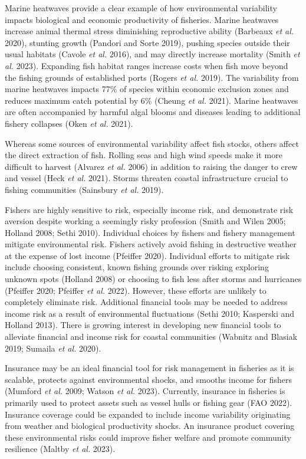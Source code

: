 \documentclass[
  letterpaper,
  DIV=11,
  numbers=noendperiod]{scrartcl}
\theoremstyle{plain}
\theoremstyle{plain}
\theoremstyle{remark}
\begin{document}
Marine heatwaves provide a clear example of how environmental
variability impacts biological and economic productivity of fisheries.
Marine heatwaves increase animal thermal stress diminishing reproductive
ability (Barbeaux \emph{et al.} 2020), stunting growth (Pandori and
Sorte 2019), pushing species outside their usual habitats (Cavole
\emph{et al.} 2016), and may directly increase mortality (Smith \emph{et
al.} 2023). Expanding fish habitat ranges increase costs when fish move
beyond the fishing grounds of established ports (Rogers \emph{et al.}
2019). The variability from marine heatwaves impacts 77\% of species
within economic exclusion zones and reduces maximum catch potential by
6\% (Cheung \emph{et al.} 2021). Marine heatwaves are often accompanied
by harmful algal blooms and diseases leading to additional fishery
collapses (Oken \emph{et al.} 2021).

Whereas some sources of environmental variability affect fish stocks,
others affect the direct extraction of fish. Rolling seas and high wind
speeds make it more difficult to harvest (Alvarez \emph{et al.} 2006) in
addition to raising the danger to crew and vessel (Heck \emph{et al.}
2021). Storms threaten coastal infrastructure crucial to fishing
communities (Sainsbury \emph{et al.} 2019).

Fishers are highly sensitive to risk, especially income risk, and
demonstrate risk aversion despite working a seemingly risky profession
(Smith and Wilen 2005; Holland 2008; Sethi 2010). Individual choices by
fishers and fishery management mitigate environmental risk. Fishers
actively avoid fishing in destructive weather at the expense of lost
income (Pfeiffer 2020). Individual efforts to mitigate risk include
choosing consistent, known fishing grounds over risking exploring
unknown spots (Holland 2008) or choosing to fish less after storms and
hurricanes (Pfeiffer 2020; Pfeiffer \emph{et al.} 2022). However, these
efforts are unlikely to completely eliminate risk. Additional financial
tools may be needed to address income risk as a result of environmental
fluctuations (Sethi 2010; Kasperski and Holland 2013). There is growing
interest in developing new financial tools to alleviate financial and
income risk for coastal communities (Wabnitz and Blasiak 2019; Sumaila
\emph{et al.} 2020).

Insurance may be an ideal financial tool for risk management in
fisheries as it is scalable, protects against environmental shocks, and
smooths income for fishers (Mumford \emph{et al.} 2009; Watson \emph{et
al.} 2023). Currently, insurance in fisheries is primarily used to
protect assets such as vessel hulls or fishing gear (FAO 2022).
Insurance coverage could be expanded to include income variability
originating from weather and biological productivity shocks. An
insurance product covering these environmental risks could improve
fisher welfare and promote community resilience (Maltby \emph{et al.}
2023).
\end{document}
